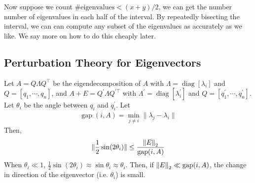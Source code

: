 \documentclass[11pt]{article}
\numberwithin{equation}{section}
\begin{document}
Now suppose we count $\#\text{eigenvalues}< (x+y)/2$, we can get the number number of eigenvalues in each half of the interval.
By repeatedly bisecting the interval, we can can compute any subset of the eigenvalues as accurately as we like. 
We say more on how to do this cheaply later.

\subsection{Perturbation Theory for Eigenvectors}
\begin{theorem}
   Let $A=Q \Lambda Q^{\top}$ be the eigendecomposition of $A$ with $\Lambda = \operatorname{diag}\left[ \lambda_i \right]$ and $Q=\left[ q_1, \cdots, q_n \right]$, 
   and $A + E=Q^\prime \Lambda Q^{\prime \top}$ with $\Lambda^\prime  = \operatorname{diag}\left[ \lambda_i^\prime  \right]$ and $Q=\left[ q_1^\prime , \cdots, q_n^\prime \right]$.
   Let $\theta_i$ be the angle between $q_i$ and $q_i^\prime$. Let \begin{align*}
       \operatorname{gap}(i, A) = \min_{j \neq i}\| \lambda_j - \lambda_i \|
   \end{align*}
   Then, \begin{align*}
       \| \frac{1}{2} \sin(2\theta_i) \| \leq \frac{\left\| E \right\|_2}{\operatorname{gap}(i, A)}
   \end{align*}
   When $\theta_i \ll 1$, $\frac{1}{2} \sin(2\theta_i) \approx \sin \theta_i \approx \theta_i$. Then, if $\left\| E \right\|_2 \ll \operatorname{gap}(i, A)$, 
   the change in direction of the eigenvector (i.e. $\theta_i$) is small.
\end{theorem}
\end{document}

